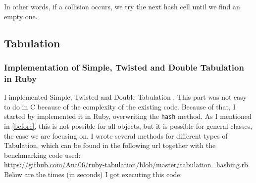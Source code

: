 \documentclass[oneside, 12pt]{article}
\theoremstyle{break}
\begin{document}
\vspace{2mm}

In other words, if a collision occurs, we try the next hash cell until we find an empty one.\\

\subsection{Tabulation}
\subsubsection{Implementation of Simple, Twisted and Double Tabulation in Ruby}

I implemented Simple, Twisted and Double Tabulation \cite{10.1145/3068772}.
This part was not easy to do in C because of the complexity of the existing code.
Because of that, I started by implemented it in Ruby, overwriting the \lstinline{hash} method.
As I mentioned in \ref{before}, this is not possible for all objects, but it is possible for general classes, the case we are focusing on.
I wrote several methods for different types of Tabulation, which can be found in the following url together with the benchmarking code used:\\
\url{https://github.com/Ana06/ruby-tabulation/blob/master/tabulation_hashing.rb}\\
Below are the times (in seconds) I got executing this code:
\end{document}
